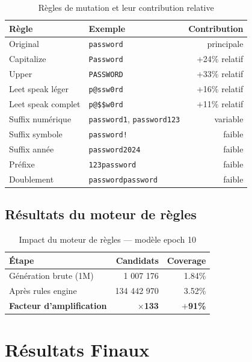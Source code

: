 \documentclass[12pt,a4paper]{article}
\begin{document}
\begin{table}[H]
\centering
\begin{tabular}{llr}
\toprule
\textbf{Règle} & \textbf{Exemple} & \textbf{Contribution} \\
\midrule
Original & \texttt{password} & principale \\
Capitalize & \texttt{Password} & +24\% relatif \\
Upper & \texttt{PASSWORD} & +33\% relatif \\
Leet speak léger & \texttt{p@ssw0rd} & +16\% relatif \\
Leet speak complet & \texttt{p@\$\$w0rd} & +11\% relatif \\
Suffix numérique & \texttt{password1}, \texttt{password123} & variable \\
Suffix symbole & \texttt{password!} & faible \\
Suffix année & \texttt{password2024} & faible \\
Préfixe & \texttt{123password} & faible \\
Doublement & \texttt{passwordpassword} & faible \\
\bottomrule
\end{tabular}
\caption{Règles de mutation et leur contribution relative}
\end{table}

\subsection{Résultats du moteur de règles}

\begin{table}[H]
\centering
\begin{tabular}{lrr}
\toprule
\textbf{Étape} & \textbf{Candidats} & \textbf{Coverage} \\
\midrule
Génération brute (1M) & 1 007 176 & 1.84\% \\
Après rules engine & 134 442 970 & 3.52\% \\
\midrule
\textbf{Facteur d'amplification} & \textbf{$\times$133} & \textbf{$+$91\%} \\
\bottomrule
\end{tabular}
\caption{Impact du moteur de règles — modèle epoch 10}
\end{table}

\section{Résultats Finaux}
\end{document}
